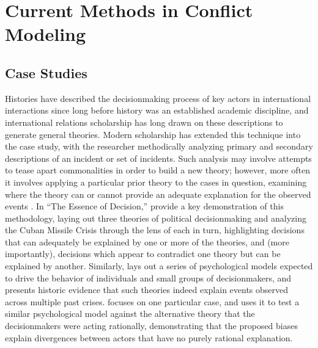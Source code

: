 \section{Current Methods in Conflict Modeling}\label{current-methods-in-conflict-modeling}

\subsection*{Case Studies}
Histories have described the decisionmaking process of key actors in international interactions since long before history was an established academic discipline, and international relations scholarship has long drawn on these descriptions to generate general theories. Modern scholarship has extended this technique into the case study, with the researcher methodically analyzing primary and secondary descriptions of an incident or set of incidents. Such analysis may involve attempts to tease apart commonalities in order to build a new theory; however, more often it involves applying a particular prior theory to the cases in question, examining where the theory can or cannot provide an adequate explanation for the observed events \citep{george_2005}. In ``The Essence of Decision,'' \citet{allison_1999} provide a key demonstration of this methodology, laying out three theories of political decisionmaking and analyzing the Cuban Missile Crisis through the lens of each in turn, highlighting decisions that can adequately be explained by one or more of the theories, and (more importantly), decisions which appear to contradict one theory but can be explained by another. Similarly, \citet{jervis_1976} lays out a series of psychological models expected to drive the behavior of individuals and small groups of decisionmakers, and presents historic evidence that such theories indeed explain events observed across multiple past crises. \citet{kaufmann_1994} focuses on one particular case, and uses it to test a similar psychological model against the alternative theory that the decisionmakers were acting rationally, demonstrating that the proposed biases explain divergences between actors that have no purely rational explanation.

